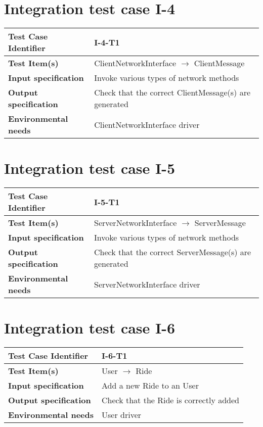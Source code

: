 
\section{Integration test case I-4}
\begin{tabular*}{1.23\textwidth}{ l l }
 \textbf{Test Case Identifier}		& I-4-T1 \\
 \hline
 \textbf{Test Item(s)}			& ClientNetworkInterface $\rightarrow$ ClientMessage \\
 \hline
 \textbf{Input specification}		& Invoke various types of network methods \\
 \hline
 \textbf{Output specification}		& Check that the correct ClientMessage(s) are generated \\
 \hline
 \textbf{Environmental needs}		& ClientNetworkInterface driver \\
\end{tabular*}

\section{Integration test case I-5}
\begin{tabular*}{1.23\textwidth}{ l l }
 \textbf{Test Case Identifier}		& I-5-T1 \\
 \hline
 \textbf{Test Item(s)}			& ServerNetworkInterface $\rightarrow$ ServerMessage \\
 \hline
 \textbf{Input specification}		& Invoke various types of network methods \\
 \hline
 \textbf{Output specification}		& Check that the correct ServerMessage(s) are generated \\
 \hline
 \textbf{Environmental needs}		& ServerNetworkInterface driver \\
\end{tabular*}

\section{Integration test case I-6}
\begin{tabular*}{1.23\textwidth}{ l l }
 \textbf{Test Case Identifier}		& I-6-T1 \\
 \hline
 \textbf{Test Item(s)}			& User $\rightarrow$ Ride \\
 \hline
 \textbf{Input specification}		& Add a new Ride to an User \\
 \hline
 \textbf{Output specification}		& Check that the Ride is correctly added \\
 \hline
 \textbf{Environmental needs}		& User driver \\
\end{tabular*}


